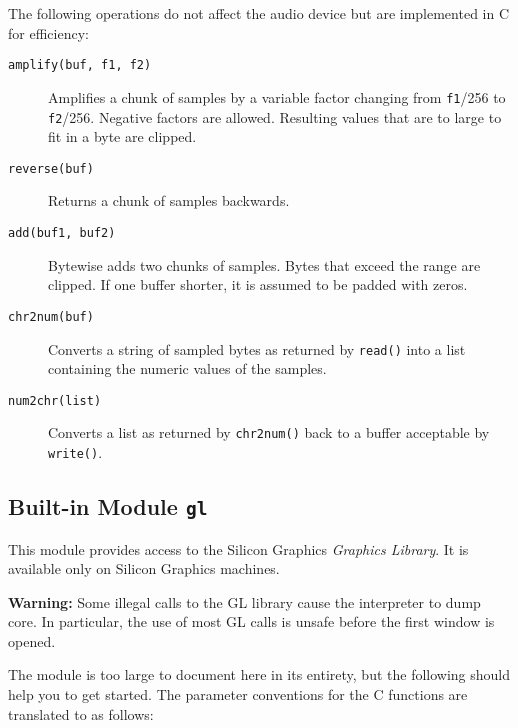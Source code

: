The following operations do not affect the audio device but are
implemented in C for efficiency:
\begin{description}
\item[{\tt amplify(buf, f1, f2)}]
Amplifies a chunk of samples by a variable factor changing from
{\tt f1}/256 to {\tt f2}/256.
Negative factors are allowed.
Resulting values that are to large to fit in a byte are clipped.         
\item[{\tt reverse(buf)}]
Returns a chunk of samples backwards.
\item[{\tt add(buf1, buf2)}]
Bytewise adds two chunks of samples.
Bytes that exceed the range are clipped.
If one buffer shorter, it is assumed to be padded with zeros.
\item[{\tt chr2num(buf)}]
Converts a string of sampled bytes as returned by {\tt read()} into
a list containing the numeric values of the samples.
\item[{\tt num2chr(list)}]
\begin{sloppypar}
Converts a list as returned by
{\tt chr2num()}
back to a buffer acceptable by
{\tt write()}.
\end{sloppypar}
\end{description}

\subsection{Built-in Module {\tt gl}}

This module provides access to the Silicon Graphics
{\em Graphics Library}.
It is available only on Silicon Graphics machines.

{\bf Warning:}
Some illegal calls to the GL library cause the {\Python} interpreter to dump
core.
In particular, the use of most GL calls is unsafe before the first
window is opened.

The module is too large to document here in its entirety, but the
following should help you to get started.
The parameter conventions for the C functions are translated to {\Python} as
follows:


